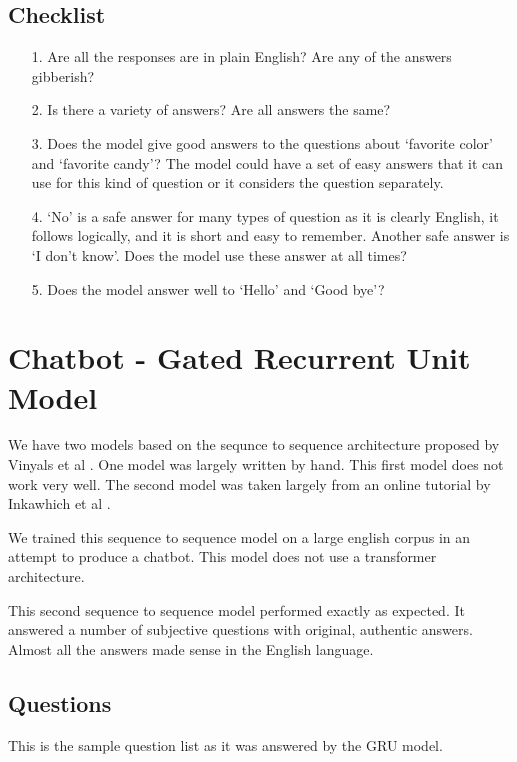 \subsection{Checklist} 

\begin{itemize}
	
	\item [1.] Are all the responses are in plain English? Are any of the answers gibberish?
	
	\item [2.] Is there a  variety of answers? Are all answers the same?
	
	\item [3.] Does the model give good answers to the questions about `favorite color' and `favorite candy'? The model could have a set of easy answers that it can use for this kind of question or it considers the question separately. 
	
	\item [4.] `No' is a safe answer for many types of question as it is clearly English, it follows logically, and it is short and easy to remember. Another safe answer is `I don't know'. Does the model use these answer at all times?
	
	\item [5.] Does the model answer well to `Hello' and `Good bye'?
	
\end{itemize}


\section{Chatbot - Gated Recurrent Unit Model}
We have two models based on the sequnce to sequence architecture proposed by Vinyals et al \cite{DBLP:journals/corr/VinyalsL15}. One model was largely written by hand. This first model does not work very well. The second model was taken largely from an online tutorial by  Inkawhich et al \cite{2018Inkawhich}.

We trained this sequence to sequence model on a large english corpus in an attempt to produce a chatbot. This model does not use a transformer architecture.

This second sequence to sequence model performed exactly as expected. It answered a number of subjective questions with original, authentic answers. Almost all the answers made sense in the English language.

\subsection{Questions}
This is the sample question list as it was answered by the GRU model.

